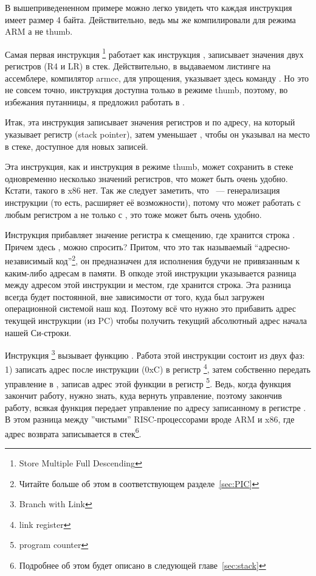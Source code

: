 В вышеприведененном примере можно легко увидеть что каждая инструкция имеет размер 4 байта. Действительно, ведь
мы же компилировали для режима ARM а не thumb.

Самая первая инструкция \footnote{Store Multiple Full Descending} работает как инструкция \PUSH, записывает значения двух регистров (R4 и LR) в стек. Действительно, в выдаваемом листинге на ассемблере, компилятор armcc, для упрощения, указывает здесь команду . Но это не совсем точно, инструкция \PUSH доступна только в режиме thumb, поэтому, во избежания путанницы, я предложил работать в \IDA.

Итак, эта инструкция записывает значения регистров  и  по адресу, на который указывает регистр  (stack pointer), затем уменьшает , чтобы он указывал на место в стеке, доступное для новых записей.

Эта инструкция, как и инструкция \PUSH в режиме thumb, может сохранить в стеке одновременно несколько значений регистров, что может быть очень удобно. Кстати, такого в x86 нет. Так же следует заметить, что  ~--- генерализация инструкции \PUSH (то есть, расширяет её возможности), потому что может работать с любым регистром а не только с , это тоже может быть очень удобно.

Инструкция  прибавляет значение регистра  к смещению, где хранится строка . Причем здесь , можно спросить? Притом, что это так называемый ``адресно-независимый код''\footnote{Читайте больше об этом в соответствующем разделе~\ref{sec:PIC}}, он предназначен для исполнения будучи не привязанным к каким-либо адресам в памяти. В опкоде этой инструкции указывается разница
между адресом этой инструкции и местом, где хранится строка. Эта разница всегда будет постоянной, вне зависимости
от того, куда был загружен операционной системой наш код. Поэтому всё что нужно это прибавить адрес текущей инструкции (из PC) чтобы получить текущий абсолютный адрес начала нашей Си-строки.

Инструкция \footnote{Branch with Link} вызывает функцию . Работа этой инструкции состоит из двух фаз: 1) записать адрес после инструкции  (0xC) в регистр \footnote{link register}, затем собственно передать управление в , записав адрес этой функции в регистр \footnote{program counter}. Ведь, когда функция  закончит работу, нужно знать, куда вернуть управление, поэтому закончив работу, всякая функция передает управление по адресу записанному в регистре . В этом разница между ''чистыми'' RISC-процессорами вроде ARM и x86, где адрес возврата записывается в стек\footnote{Подробнее об этом будет описано в следующей главе~\ref{sec:stack}}.

